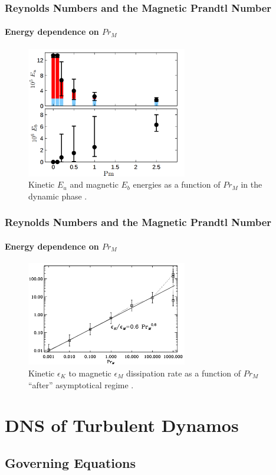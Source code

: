\documentclass{beamer}
\begin{document}
\begin{frame}
 \frametitle{Reynolds Numbers and the Magnetic Prandtl Number}
 \framesubtitle{Energy dependence on $Pr_M$}
 
 \begin{figure}[t]
  \includegraphics[width=7cm]{img/E_u_vs_b_PrM2015}
  \caption{Kinetic $E_u$ and magnetic $E_b$ energies as a function of $Pr_M$ in the dynamic phase \cite{guervilly2015generation}.}
  \centering
 \end{figure}
\end{frame}

\begin{frame}
 \frametitle{Reynolds Numbers and the Magnetic Prandtl Number}
 \framesubtitle{Energy dependence on $Pr_M$}
 
 \begin{figure}[t]
  \includegraphics[width=7cm]{img/Pr_M_Brandenburg2010}
  \caption{Kinetic $\epsilon_K$ to magnetic $\epsilon_M$ dissipation rate as a function of $Pr_M$ ``after'' asymptotical regime \cite{brandenburg2011dissipation}.}
  \centering
 \end{figure}
\end{frame}


\section{DNS of Turbulent Dynamos}

\subsection{Governing Equations}
\end{document}
